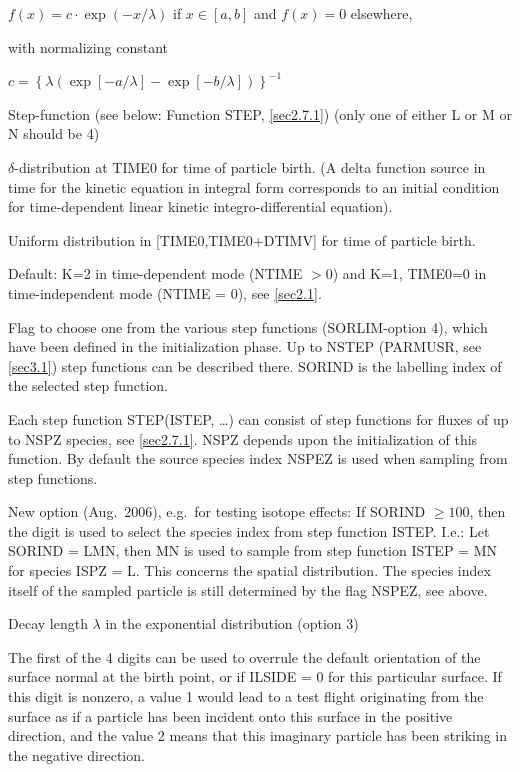 \begin{description}
\begin{description}
                $f(x) = c  \cdot   \exp( - x/ \lambda)$ if $x \in [a,b]$ and $f(x) = 0$
                elsewhere, 

                with normalizing constant 

                $c = \left\{\lambda (\exp[ -a/ \lambda] - \exp[-b/ \lambda])\right\}^{-1}$
          \item[L,M,N = 4] Step-function (see below: Function STEP, \cref{sec2.7.1})
                (only one of either L or M or N should be 4)
          \item[K = 1] $\delta$-distribution
                at TIME0 for time of particle birth.
                (A delta function source in time for the kinetic equation in integral form
                corresponds to an initial condition for time-dependent linear kinetic
                integro-differential equation).
          \item[K = 2] Uniform distribution in [TIME0,TIME0+DTIMV] for time of particle
                birth.

                Default: K=2 in time-dependent mode (NTIME $>$0) and K=1, TIME0=0 in
                time-independent mode (NTIME = 0), see \cref{sec2.1}.
        \end{description}
  \item[SORIND] Flag to choose one from the various step functions (SORLIM-option
        4), which have been defined in the initialization phase.
        Up to NSTEP (PARMUSR, see \cref{sec3.1}) step functions can be described there.
        SORIND is the labelling index of the selected step function.

        Each step function STEP(ISTEP, \dots) can consist of step functions for fluxes
        of up to NSPZ species, see \cref{sec2.7.1}.
        NSPZ depends upon the initialization of this function.
        By default the source species index NSPEZ is used when sampling from step
        functions.

        New option (Aug.\ 2006), e.g.\ for testing isotope effects: If SORIND $\geq
          100$, then the  digit is used to select the species index from
        step function ISTEP.
        I.e.: Let SORIND = LMN, then MN is used to sample from	step function ISTEP =
        MN  for species ISPZ = L.
        This concerns the spatial distribution.
        The species index itself of the sampled particle is still determined by the
        flag NSPEZ, see above.

  \item[SOREXP] Decay length $\lambda$	in the exponential distribution (option
        3)
  \item[SORIFL] The first of the 4 digits can be used to overrule the default
        orientation of the surface normal at the birth point, or if ILSIDE = 0 for this
        particular surface.
        If this digit is nonzero, a value 1 would lead to a test flight originating
        from the surface as if a particle has been incident onto this surface in the
        positive direction, and the value 2 means that this imaginary particle has been
        striking in the negative direction.


\end{description}

